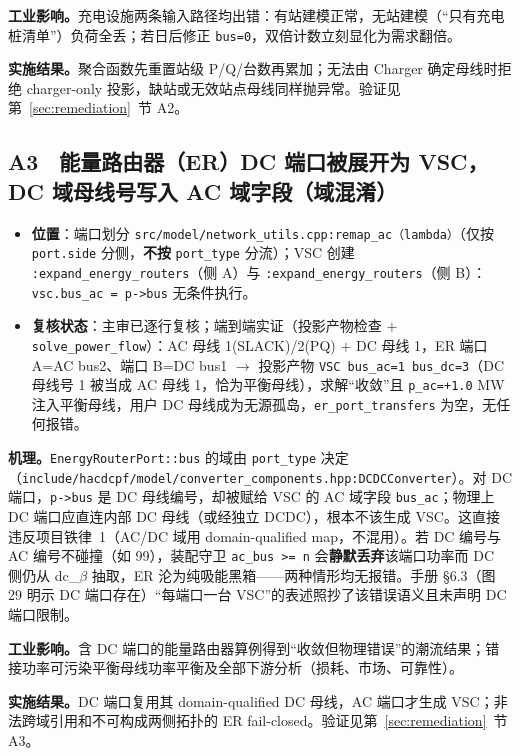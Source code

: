 \documentclass[11pt,a4paper,fontset=fandol]{ctexart}
\newcommand{\file}[1]{\texttt{#1}}
\begin{document}
\textbf{工业影响。}充电设施两条输入路径均出错：有站建模正常，无站建模（``只有充电桩清单''）负荷全丢；若日后修正 \texttt{bus=0}，双倍计数立刻显化为需求翻倍。

\textbf{实施结果。}聚合函数先重置站级 P/Q/台数再累加；无法由 Charger 确定母线时拒绝 charger-only 投影，缺站或无效站点母线同样抛异常。验证见第~\ref{sec:remediation}~节 A2。

\subsection{A3　能量路由器（ER）DC 端口被展开为 VSC，DC 域母线号写入 AC 域字段（域混淆）}
\label{sec:a3}

\begin{itemize}
  \item \textbf{位置}：端口划分 \file{src/model/network\_utils.cpp:remap\_ac（lambda）}（仅按 \texttt{port.side} 分侧，\textbf{不按} \texttt{port\_type} 分流）；VSC 创建 \file{:expand\_energy\_routers}（侧 A）与 \file{:expand\_energy\_routers}（侧 B）：\texttt{vsc.bus\_ac = p->bus} 无条件执行。
  \item \textbf{复核状态}：主审已逐行复核；端到端实证（投影产物检查 $+$ \file{solve\_power\_flow}）：AC 母线 1(SLACK)/2(PQ) $+$ DC 母线 1，ER 端口 A=AC bus2、端口 B=DC bus1 $\to$ 投影产物 \texttt{VSC bus\_ac=1 bus\_dc=3}（DC 母线号 1 被当成 AC 母线 1，恰为平衡母线），求解``收敛''且 \texttt{p\_ac=+1.0} MW 注入平衡母线，用户 DC 母线成为无源孤岛，\texttt{er\_port\_transfers} 为空，无任何报错。
\end{itemize}

\textbf{机理。}\texttt{EnergyRouterPort::bus} 的域由 \texttt{port\_type} 决定（\file{include/hacdcpf/model/converter\_components.hpp:DCDCConverter}）。对 DC 端口，\texttt{p->bus} 是 DC 母线编号，却被赋给 VSC 的 AC 域字段 \texttt{bus\_ac}；物理上 DC 端口应直连内部 DC 母线（或经独立 DCDC），根本不该生成 VSC。这直接违反项目铁律~1（AC/DC 域用 domain-qualified map，不混用）。若 DC 编号与 AC 编号不碰撞（如 99），装配守卫 \texttt{ac\_bus >= n} 会\textbf{静默丢弃}该端口功率而 DC 侧仍从 dc\_$\beta$ 抽取，ER 沦为纯吸能黑箱——两种情形均无报错。手册 \S 6.3（图 29 明示 DC 端口存在）``每端口一台 VSC''的表述照抄了该错误语义且未声明 DC 端口限制。

\textbf{工业影响。}含 DC 端口的能量路由器算例得到``收敛但物理错误''的潮流结果；错接功率可污染平衡母线功率平衡及全部下游分析（损耗、市场、可靠性）。

\textbf{实施结果。}DC 端口复用其 domain-qualified DC 母线，AC 端口才生成 VSC；非法跨域引用和不可构成两侧拓扑的 ER fail-closed。验证见第~\ref{sec:remediation}~节 A3。
\end{document}
